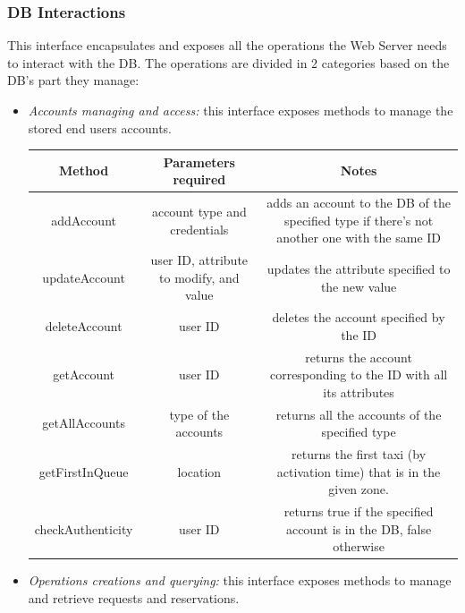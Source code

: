 \documentclass{article}
\begin{document}
\subsubsection{DB Interactions}
This interface encapsulates and exposes all the operations the Web Server needs to interact with the DB\@. The operations are divided in 2 categories based on the DB's part they manage:
\begin{itemize}	
	\item \textit{Accounts managing and access:} this interface exposes methods to manage the stored end users accounts.\\	
	\begin{table}[H]
		\begin{adjustbox}{width=1.2\textwidth}
			\begin{tabular}{*{3}{c}}
				\toprule
				Method & Parameters required & Notes \\
				\midrule
				addAccount & account type and credentials & adds an account to the DB of the specified type if there's not another one with the same ID\\
				updateAccount & user ID, attribute to modify, and value & updates the attribute specified to the new value\\ 
				deleteAccount & user ID & deletes the account specified by the ID \\
				getAccount & user ID & returns the account corresponding to the ID with all its attributes \\
				getAllAccounts & type of the accounts & returns all the accounts of the specified type \\
				getFirstInQueue & location & returns the first taxi (by activation time) that is in the given zone.\\
				checkAuthenticity & user ID & returns true if the specified account is in the DB, false otherwise \\
				\bottomrule
			\end{tabular}	
		\end{adjustbox}
	\end{table}
\item \textit{Operations creations and querying:} this interface exposes methods to manage and retrieve requests and reservations.\\	

\end{itemize}
\end{document}
